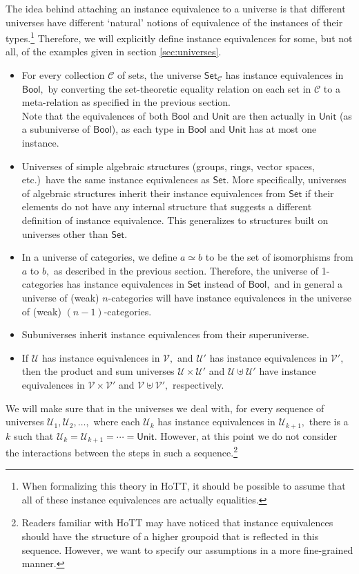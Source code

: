 \documentclass[a4paper]{article}
\theoremstyle{definition}
\theoremstyle{remark}
\renewcommand{\equiv}{\simeq}
\newcommand{\C}{\mathcal{C}}
\newcommand{\U}{\mathcal{U}}
\newcommand{\V}{\mathcal{V}}
\newcommand{\nm}{\mathsf}
\newcommand{\universe}{\nm}
\newcommand{\Unit}{\universe{Unit}}
\newcommand{\Bool}{\universe{Bool}}
\newcommand{\Set}{\universe{Set}}
\begin{document}
The idea behind attaching an instance equivalence to a universe is that different universes
have different `natural' notions of equivalence of the instances of their
types.\footnote{When formalizing this theory in HoTT, it should be possible to assume that
all of these instance equivalences are actually equalities.}
Therefore, we will explicitly define instance equivalences for some, but not all, of the
examples given in section \ref{sec:universes}.

\begin{itemize}
  \item For every collection $\C$ of sets, the universe $\Set_\C$ has instance equivalences
  in $\Bool,$ by converting the set-theoretic equality relation on each set in $\C$ to a
  meta-relation as specified in the previous section.\\
  Note that the equivalences of both $\Bool$ and $\Unit$ are then actually in $\Unit$ (as a
  subuniverse of $\Bool$), as each type in $\Bool$ and $\Unit$ has at most one instance.
  \item Universes of simple algebraic structures (groups, rings, vector spaces, etc.)\ have
  the same instance equivalences as $\Set.$ More specifically, universes of algebraic
  structures inherit their instance equivalences from $\Set$ if their elements do not have
  any internal structure that suggests a different definition of instance equivalence.
  This generalizes to structures built on universes other than $\Set.$
  \item In a universe of categories, we define $a \equiv b$ to be the set of isomorphisms
  from $a$ to $b,$ as described in the previous section. Therefore, the universe of
  1-categories has instance equivalences in $\Set$ instead of $\Bool,$ and in general a
  universe of (weak) $n$-categories will have instance equivalences in the universe of (weak)
  $(n-1)$-categories.
  \item Subuniverses inherit instance equivalences from their superuniverse.
  \item If $\U$ has instance equivalences in $\V,$ and $\U'$ has instance equivalences in
  $\V',$ then the product and sum universes $\U \times \U'$ and $\U \uplus \U'$ have instance
  equivalences in $\V \times \V'$ and $\V \uplus \V',$ respectively.
\end{itemize}

We will make sure that in the universes we deal with, for every sequence of universes
$\U_1, \U_2, \ldots,$ where each $\U_k$ has instance equivalences in $\U_{k+1},$ there is
a $k$ such that $\U_k = \U_{k+1} = \cdots = \Unit.$ However, at this point we do not consider
the interactions between the steps in such a sequence.\footnote{Readers familiar with HoTT may
have noticed that instance equivalences should have the structure of a higher groupoid that is
reflected in this sequence. However, we want to specify our assumptions in a more fine-grained
manner.}
\end{document}
